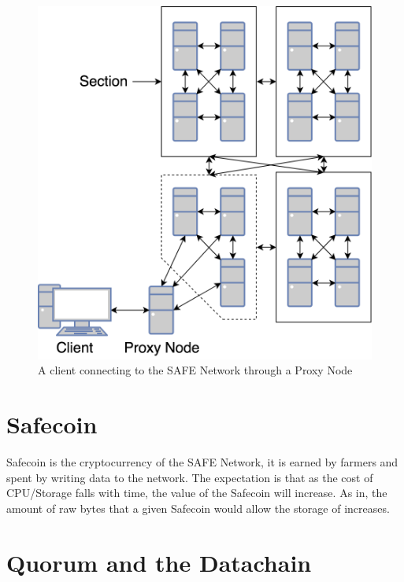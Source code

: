 \begin{figure}
	\begin{center}
		\includegraphics[scale=0.35]{diagrams/safe-network-connection}
		\caption{A client connecting to the SAFE Network through a Proxy Node}
		\label{fig:proxy-connection}
	\end{center}
\end{figure}

\section{Safecoin}

Safecoin is the cryptocurrency of the SAFE Network, it is earned by farmers and spent by writing data to the network. The expectation is that as the cost of CPU/Storage falls with time, the value of the Safecoin will increase. As in, the amount of raw bytes that a given Safecoin would allow the storage of increases.

\section{Quorum and the Datachain}

